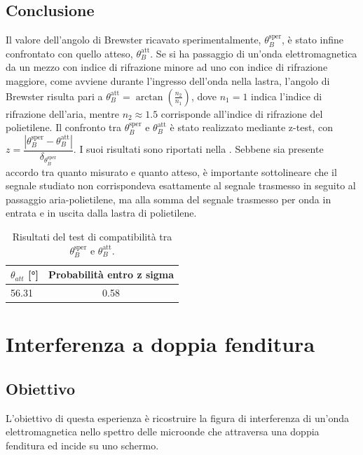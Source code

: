 \documentclass[a4paper]{article}
\begin{document}
\subsection{Conclusione}
Il valore dell'angolo di Brewster ricavato sperimentalmente, $\theta_B^{\text{sper}}$, è stato infine confrontato con quello atteso, $\theta_B^{\text{att}}$. Se si ha passaggio di un'onda elettromagnetica da un mezzo con indice di rifrazione minore ad uno con indice di rifrazione maggiore, come avviene durante l'ingresso dell'onda nella lastra, l'angolo di Brewster risulta pari a $\theta_B^{\text{att}} = \arctan\left(\frac{n_2}{n_1}\right)$, dove $n_1 = 1$ indica l'indice di rifrazione dell'aria, mentre $n_2 \approx 1.5$ corrisponde all'indice di rifrazione del polietilene. Il confronto tra $\theta_B^{\text{sper}}$ e $\theta_B^{\text{att}}$ è stato realizzato mediante z-test, con $z = \dfrac{|\theta_B^{\text{sper}} - \theta_B^{\text{att}}|}{\delta_{\theta_B^{\text{sper}}}}$. I suoi risultati sono riportati nella . Sebbene sia presente accordo tra quanto misurato e quanto atteso, è importante sottolineare che il segnale studiato non corrispondeva esattamente al segnale trasmesso in seguito al passaggio aria-polietilene, ma alla somma del segnale trasmesso per onda in entrata e in uscita dalla lastra di polietilene.
\begin{table}[htbp] 
\centering
\caption{Risultati del test di compatibilità tra $\theta_B^{\text{sper}}$ e $\theta_B^{\text{att}}$.}
\label{tab:brewster_compatibilita}
\begin{tabular}{|l|c|}
\hline
$\theta_{att}$ [\si{\degree}] & Probabilità entro z sigma \\
\hline
56.31 & 0.58 \\
\bottomrule
\end{tabular}
\end{table}


\section{Interferenza a doppia fenditura}
\subsection{Obiettivo}
L'obiettivo di questa esperienza è ricostruire la figura di interferenza di un'onda elettromagnetica nello spettro delle microonde che attraversa una doppia fenditura ed incide su uno schermo.
\end{document}
